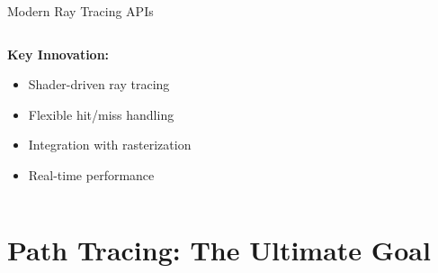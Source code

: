 \begin{frame}{Modern Ray Tracing APIs}
\begin{columns}
\begin{column}{0.5\textwidth}
            
            \vspace{0.5cm}
            \textbf{Key Innovation:}
            \begin{itemize}
                \item Shader-driven ray tracing
                \item Flexible hit/miss handling
                \item Integration with rasterization
                \item Real-time performance
            \end{itemize}
        \end{column}
    \end{columns}
\end{frame}

\section{Path Tracing: The Ultimate Goal}

